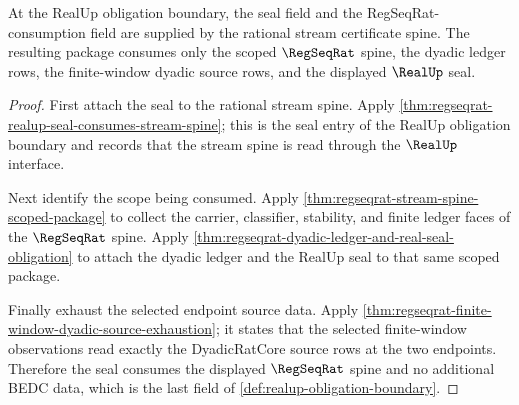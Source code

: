 \begin{theorem}
\label{thm:realup-seal-and-regseqrat-consumption-obligations}
At the RealUp obligation boundary, the seal field and the RegSeqRat-consumption
field are supplied by the rational stream certificate spine. The resulting
package consumes only the scoped $\RegSeqRat$ spine, the dyadic ledger rows,
the finite-window dyadic source rows, and the displayed $\RealUp$ seal.
\end{theorem}
\begin{proof}
First attach the seal to the rational stream spine. Apply
\autoref{thm:regseqrat-realup-seal-consumes-stream-spine}; this is the seal
entry of the RealUp obligation boundary and records that the stream spine is
read through the $\RealUp$ interface.

Next identify the scope being consumed. Apply
\autoref{thm:regseqrat-stream-spine-scoped-package} to collect the carrier,
classifier, stability, and finite ledger faces of the $\RegSeqRat$ spine.
Apply \autoref{thm:regseqrat-dyadic-ledger-and-real-seal-obligation} to attach
the dyadic ledger and the RealUp seal to that same scoped package.

Finally exhaust the selected endpoint source data. Apply
\autoref{thm:regseqrat-finite-window-dyadic-source-exhaustion}; it states that
the selected finite-window observations read exactly the DyadicRatCore source
rows at the two endpoints. Therefore the seal consumes the displayed
$\RegSeqRat$ spine and no additional BEDC data, which is the last field of
\autoref{def:realup-obligation-boundary}.
\end{proof}

